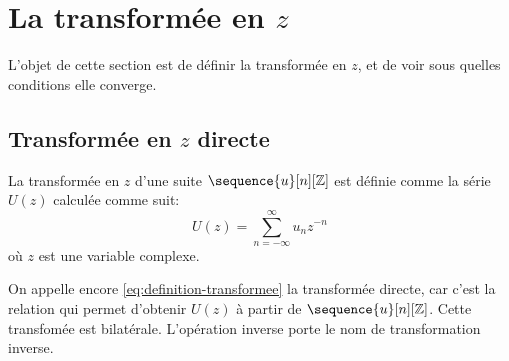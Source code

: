 \section{La transform\'{e}e en $z$}
L'objet de cette section est de d\'{e}finir la transform\'{e}e en $z$, et de voir sous quelles conditions elle converge.
\subsection{Transformée en $z$ directe}
\begin{definition}[Transformée en $z$]
\label{def:transformee}
La transform\'{e}e en $z$ d'une suite $\sequence{u}[n][\zset]$ est d\'{e}finie comme la s\'{e}rie $U(z)$ calcul\'{e}e comme suit:
\begin{equation}
\label{eq:definition-transformee}
U(z)=\sum_{n=-\infty}^{\infty} u_n z^{-n}
\end{equation}
o\`{u} $z$ est une variable complexe.
\end{definition}
On appelle encore \eqref{eq:definition-transformee} la transform\'{e}e directe, car c'est la relation qui permet d'obtenir $U(z)$ \`{a} partir de $\sequence{u}[n][\zset]$. Cette transfomée est bilatérale. L'op\'{e}ration inverse porte le nom de transformation inverse.

